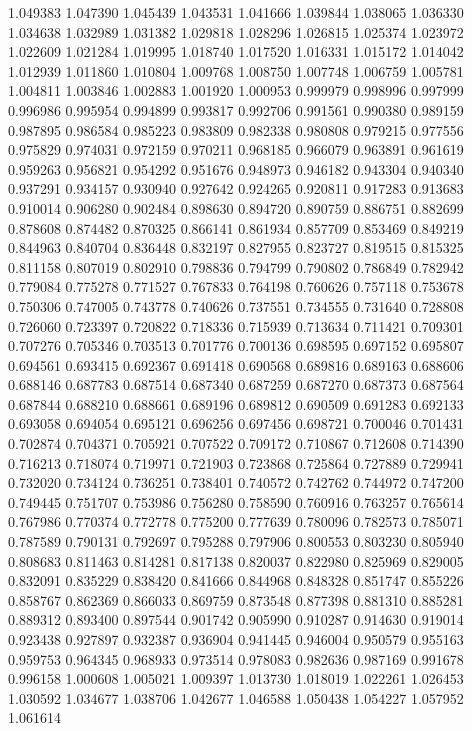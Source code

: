 1.049383
1.047390
1.045439
1.043531
1.041666
1.039844
1.038065
1.036330
1.034638
1.032989
1.031382
1.029818
1.028296
1.026815
1.025374
1.023972
1.022609
1.021284
1.019995
1.018740
1.017520
1.016331
1.015172
1.014042
1.012939
1.011860
1.010804
1.009768
1.008750
1.007748
1.006759
1.005781
1.004811
1.003846
1.002883
1.001920
1.000953
0.999979
0.998996
0.997999
0.996986
0.995954
0.994899
0.993817
0.992706
0.991561
0.990380
0.989159
0.987895
0.986584
0.985223
0.983809
0.982338
0.980808
0.979215
0.977556
0.975829
0.974031
0.972159
0.970211
0.968185
0.966079
0.963891
0.961619
0.959263
0.956821
0.954292
0.951676
0.948973
0.946182
0.943304
0.940340
0.937291
0.934157
0.930940
0.927642
0.924265
0.920811
0.917283
0.913683
0.910014
0.906280
0.902484
0.898630
0.894720
0.890759
0.886751
0.882699
0.878608
0.874482
0.870325
0.866141
0.861934
0.857709
0.853469
0.849219
0.844963
0.840704
0.836448
0.832197
0.827955
0.823727
0.819515
0.815325
0.811158
0.807019
0.802910
0.798836
0.794799
0.790802
0.786849
0.782942
0.779084
0.775278
0.771527
0.767833
0.764198
0.760626
0.757118
0.753678
0.750306
0.747005
0.743778
0.740626
0.737551
0.734555
0.731640
0.728808
0.726060
0.723397
0.720822
0.718336
0.715939
0.713634
0.711421
0.709301
0.707276
0.705346
0.703513
0.701776
0.700136
0.698595
0.697152
0.695807
0.694561
0.693415
0.692367
0.691418
0.690568
0.689816
0.689163
0.688606
0.688146
0.687783
0.687514
0.687340
0.687259
0.687270
0.687373
0.687564
0.687844
0.688210
0.688661
0.689196
0.689812
0.690509
0.691283
0.692133
0.693058
0.694054
0.695121
0.696256
0.697456
0.698721
0.700046
0.701431
0.702874
0.704371
0.705921
0.707522
0.709172
0.710867
0.712608
0.714390
0.716213
0.718074
0.719971
0.721903
0.723868
0.725864
0.727889
0.729941
0.732020
0.734124
0.736251
0.738401
0.740572
0.742762
0.744972
0.747200
0.749445
0.751707
0.753986
0.756280
0.758590
0.760916
0.763257
0.765614
0.767986
0.770374
0.772778
0.775200
0.777639
0.780096
0.782573
0.785071
0.787589
0.790131
0.792697
0.795288
0.797906
0.800553
0.803230
0.805940
0.808683
0.811463
0.814281
0.817138
0.820037
0.822980
0.825969
0.829005
0.832091
0.835229
0.838420
0.841666
0.844968
0.848328
0.851747
0.855226
0.858767
0.862369
0.866033
0.869759
0.873548
0.877398
0.881310
0.885281
0.889312
0.893400
0.897544
0.901742
0.905990
0.910287
0.914630
0.919014
0.923438
0.927897
0.932387
0.936904
0.941445
0.946004
0.950579
0.955163
0.959753
0.964345
0.968933
0.973514
0.978083
0.982636
0.987169
0.991678
0.996158
1.000608
1.005021
1.009397
1.013730
1.018019
1.022261
1.026453
1.030592
1.034677
1.038706
1.042677
1.046588
1.050438
1.054227
1.057952
1.061614
